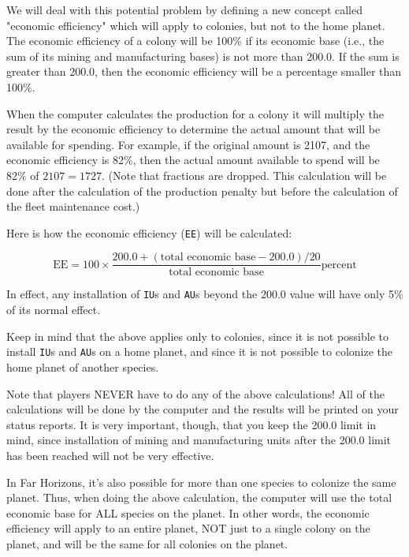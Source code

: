 \documentclass[10pt,titlepage]{article}
\begin{document}
We will deal with this potential problem by defining a new concept called
"economic efficiency" which will apply to colonies, but not to the home planet.
The economic efficiency of a colony will be 100\% if its economic base (i.e.,
the sum of its mining and manufacturing bases) is not more than 200.0.  If the
sum is greater than 200.0, then the economic efficiency will be a percentage
smaller than 100\%.

When the computer calculates the production for a colony it will multiply the
result by the economic efficiency to determine the actual amount that will be
available for spending.  For example, if the original amount is 2107, and the
economic efficiency is 82\%, then the actual amount available to spend will
be $82\%$ of $2107 = 1727$.  (Note that fractions are dropped.  This calculation
will be done after the calculation of the production penalty but before the
calculation of the fleet maintenance cost.)

Here is how the economic efficiency (\texttt{EE}) will be calculated:

\[
     \textrm{EE}  =  100  \times  \dfrac{200.0 + (\textrm{total economic base} - 200.0) / 20}{\textrm{total economic base}}\textrm{percent}
  \]                              

In effect, any installation of \texttt{IU}s and \texttt{AU}s beyond the 200.0 value will have
only 5\% of its normal effect.

\begin{informationnote}
Keep in mind that the above applies only to colonies, since it is not
possible to install \texttt{IU}s and \texttt{AU}s on a home planet, and since it is not
possible to colonize the home planet of another species.
\end{informationnote}

Note that players NEVER have to do any of the above calculations! All of the
calculations will be done by the computer and the results will be printed on
your status reports.  It is very important, though, that you keep the 200.0
limit in mind, since installation of mining and manufacturing units after the
200.0 limit has been reached will not be very effective.

In Far Horizons, it's also possible for more than one species to colonize the
same planet.  Thus, when doing the above calculation, the computer will use
the total economic base for ALL species on the planet.  In other words, the
economic efficiency will apply to an entire planet, NOT just to a single colony
on the planet, and will be the same for all colonies on the planet.
\end{document}
